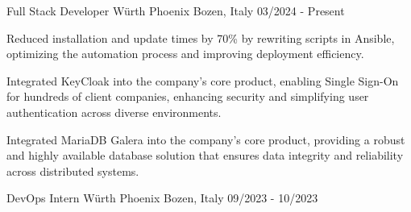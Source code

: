 
\begin{cventries}

	\cventry
	{Full Stack Developer} %
	{Würth Phoenix} %
	{Bozen, Italy} %
	{03/2024 - Present} %
	{
		\begin{cvitems} %
			\item Reduced installation and update times by 70\% by rewriting scripts in Ansible, optimizing the automation process and improving deployment efficiency.
			\item Integrated KeyCloak into the company's core product, enabling Single Sign-On for hundreds of client companies, enhancing security and simplifying user authentication across diverse environments.
			\item Integrated MariaDB Galera into the company's core product, providing a robust and highly available database solution that ensures data integrity and reliability across distributed systems.
		\end{cvitems}
	}


	\cventry
	{DevOps Intern} %
	{Würth Phoenix} %
	{Bozen, Italy} %
	{09/2023 - 10/2023} %
	{} %

\end{cventries}
